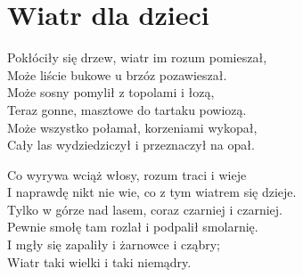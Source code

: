 \section{Wiatr dla dzieci}
\begin{text}
Pokłóciły się drzew, wiatr im rozum pomieszał,\\
Może liście bukowe u brzóz pozawieszał.\\
Może sosny pomylił z topolami i łozą,\\
Teraz gonne, masztowe do tartaku powiozą.\\
Może wszystko połamał, korzeniami wykopał,\\
Cały las wydziedziczył i przeznaczył na opał.

Co wyrywa wciąż włosy, rozum traci i wieje\\
I naprawdę nikt nie wie, co z tym wiatrem się dzieje.\\
Tylko w górze nad lasem, coraz czarniej i czarniej.\\
Pewnie smołę tam rozlał i podpalił smolarnię.\\
I mgły się zapaliły i żarnowce i cząbry;\\
Wiatr taki wielki i taki niemądry.
\end{text}